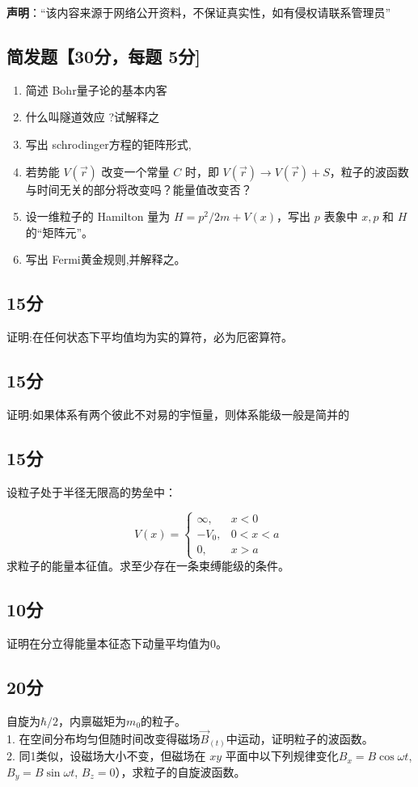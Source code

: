 
\textbf{声明}：“该内容来源于网络公开资料，不保证真实性，如有侵权请联系管理员”

\subsection{简发题【30分，每题 5分]}
\begin{enumerate}
\item 简述 Bohr量子论的基本内客
\item 什么叫隧道效应 ?试解释之
\item 写出 schrodinger方程的钜阵形式,
\item 若势能 $V(\vec{r})$ 改变一个常量 $C$ 时，即 $V(\vec{r}) \rightarrow V(\vec{r}) + S$，粒子的波函数与时间无关的部分将改变吗？能量值改变否？
\item 设一维粒子的 Hamilton 量为 $H = p^2/2m + V(x)$，写出 $p$ 表象中 $x, p$ 和 $H$ 的“矩阵元”。
\item 写出 Fermi黄金规则,并解释之。
\end{enumerate}
\subsection{15分}
证明:在任何状态下平均值均为实的算符，必为厄密算符。
\subsection{15分}
证明:如果体系有两个彼此不对易的宇恒量，则体系能级一般是简并的
\subsection{15分}
设粒子处于半径无限高的势垒中：

\[
V(x) =
\begin{cases}
\infty, & x < 0 \\
-V_0, & 0 < x < a \\
0, & x > a
\end{cases}~
\]
求粒子的能量本征值。求至少存在一条束缚能级的条件。
\subsection{10分}
证明在分立得能量本征态下动量平均值为0。
\subsection{20分}
自旋为$\hbar/2$，内禀磁矩为$m_0$的粒子。\\
1. 在空间分布均匀但随时间改变得磁场$\vec{B}_(t)$中运动，证明粒子的波函数。\\
2. 同1类似，设磁场大小不变，但磁场在 $x y $ 平面中以下列规律变化$B_x = B \cos \omega t$, $B_y = B \sin \omega t$, $B_z = 0$），求粒子的自旋波函数。
